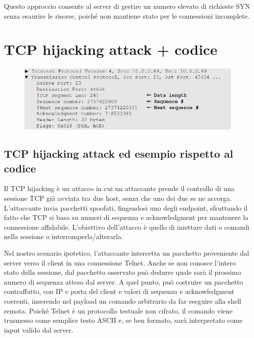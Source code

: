 \documentclass{report}
\begin{document}
\noindent Questo approccio consente al server di gestire un numero elevato di richieste SYN senza esaurire le risorse, poiché non mantiene stato per le connessioni incomplete.

\section{TCP hijacking attack + codice}

\begin{figure}[H]
    \centering
    \includegraphics[width=1\linewidth]{images/codiceHijacking.png}
\end{figure}

\subsection{TCP hijacking attack ed esempio rispetto al codice}
Il TCP hijacking è un attacco in cui un attaccante prende il controllo di una sessione TCP già avviata tra due host, senza che uno dei due se ne accorga. L'attaccante invia pacchetti spoofati, fingendosi uno degli
endpoint, sfruttando il fatto che TCP si basa su numeri di sequenza e acknowledgment per mantenere la connessione affidabile. L'obiettivo dell'attacco è quello di iniettare dati o comandi nella sessione o interromperla/alterarla.

\noindent Nel nostro scenario ipotetico, l'attaccante intercetta un pacchetto proveniente dal server verso il client in una connessione Telnet. Anche se non conosce l'intero stato della sessione, dal pacchetto osservato può dedurre quale sarà il prossimo numero di sequenza atteso dal server.
A quel punto, può costruire un pacchetto contraffatto, con IP e porta del client e valori di sequenza e acknowledgment coerenti, inserendo nel payload un comando arbitrario da far eseguire alla shell remota. 
Poiché Telnet è un protocollo testuale non cifrato, il comando viene trasmesso come semplice testo ASCII e, se ben formato, sarà interpretato come input valido dal server.
\end{document}
